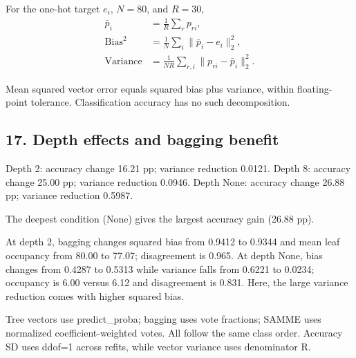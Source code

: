 \documentclass[10pt,twocolumn,letterpaper]{article}
\begin{document}
For the one-hot target $e_i$, $N=80$, and $R=30$,
\begin{align*}
\bar p_i &= \frac{1}{R}\sum_r p_{ri},\\
\mathrm{Bias}^2 &= \frac1N\sum_i\|\bar p_i-e_i\|_2^2,\\
\mathrm{Variance} &= \frac1{NR}\sum_{r,i}\|p_{ri}-\bar p_i\|_2^2.
\end{align*}

Mean squared vector error equals squared bias plus variance, within floating-point tolerance. Classification accuracy has no such decomposition.

\newpage
\subsection*{17. Depth effects and bagging benefit}
Depth 2: accuracy change 16.21 pp; variance reduction 0.0121. Depth 8: accuracy change 25.00 pp; variance reduction 0.0946. Depth None: accuracy change 26.88 pp; variance reduction 0.5987.

The deepest condition (None) gives the largest accuracy gain (26.88 pp).

At depth 2, bagging changes squared bias from 0.9412 to 0.9344 and mean leaf occupancy from 80.00 to 77.07; disagreement is 0.965. At depth None, bias changes from 0.4287 to 0.5313 while variance falls from 0.6221 to 0.0234; occupancy is 6.00 versus 6.12 and disagreement is 0.831. Here, the large variance reduction comes with higher squared bias.

Tree vectors use predict\_proba; bagging uses vote fractions; SAMME uses normalized coefficient-weighted votes. All follow the same class order. Accuracy SD uses ddof=1 across refits, while vector variance uses denominator R.

\clearpage
{}
\end{document}
